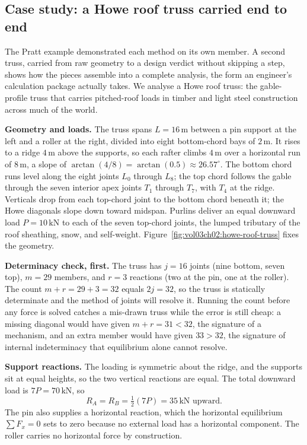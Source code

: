\subsection{Case study: a Howe roof truss carried end to end}

The Pratt example demonstrated each method on its own member. A second
truss, carried from raw geometry to a design verdict without skipping a
step, shows how the pieces assemble into a complete analysis, the form an
engineer's calculation package actually takes. We analyse a Howe roof
truss: the gable-profile truss that carries pitched-roof loads in timber
and light steel construction across much of the world.

\textbf{Geometry and loads.} The truss spans $L = 16\,\si{\meter}$
between a pin support at the left and a roller at the right, divided into
eight bottom-chord bays of $2\,\si{\meter}$. It rises to a ridge
$4\,\si{\meter}$ above the supports, so each rafter climbs
$4\,\si{\meter}$ over a horizontal run of $8\,\si{\meter}$, a slope of
$\arctan(4/8) = \arctan(0.5) \approx 26.57^{\circ}$. The bottom chord
runs level along the eight joints $L_0$ through $L_8$; the top chord
follows the gable through the seven interior apex joints $T_1$ through
$T_7$, with $T_4$ at the ridge. Verticals drop from each top-chord joint
to the bottom chord beneath it; the Howe diagonals slope down toward
midspan. Purlins deliver an equal downward load $P = 10\,\text{kN}$ to
each of the seven top-chord joints, the lumped tributary of the roof
sheathing, snow, and self-weight.
Figure~\ref{fig:vol03ch02:howe-roof-truss} fixes the geometry.



\textbf{Determinacy check, first.} The truss has $j = 16$ joints (nine
bottom, seven top), $m = 29$ members, and $r = 3$ reactions (two at the
pin, one at the roller). The count $m + r = 29 + 3 = 32$ equals
$2j = 32$, so the truss is statically determinate and the method of
joints will resolve it. Running the count before any force is solved
catches a mis-drawn truss while the error is still cheap: a missing
diagonal would have given $m + r = 31 < 32$, the signature of a
mechanism, and an extra member would have given $33 > 32$, the signature
of internal indeterminacy that equilibrium alone cannot resolve.

\textbf{Support reactions.} The loading is symmetric about the ridge, and
the supports sit at equal heights, so the two vertical reactions are
equal. The total downward load is $7P = 70\,\text{kN}$, so
\[
R_A = R_B = \tfrac{1}{2}(7P) = 35\,\text{kN} \text{ upward}.
\]
The pin also supplies a horizontal reaction, which the horizontal
equilibrium $\sum F_x = 0$ sets to zero because no external load has a
horizontal component. The roller carries no horizontal force by
construction.


